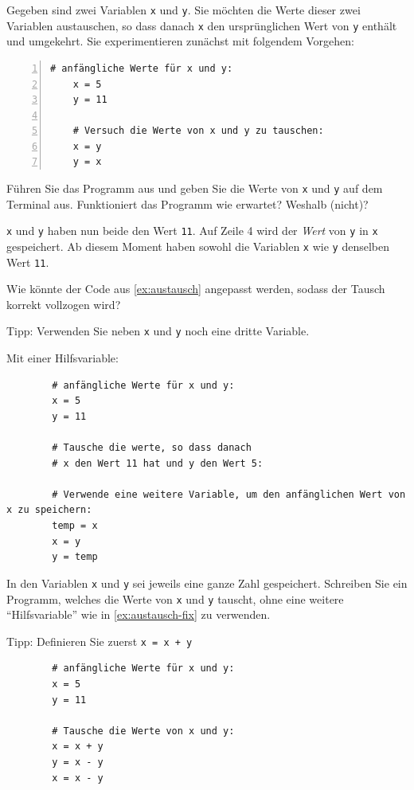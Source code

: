 \begin{myexercise}\label{ex:austausch}
	Gegeben sind zwei Variablen \lstinline|x| und \lstinline|y|. Sie möchten die Werte dieser zwei Variablen austauschen, so dass danach \lstinline|x| den ursprünglichen Wert von \lstinline|y| enthält und umgekehrt. Sie experimentieren zunächst mit folgendem Vorgehen:
	\begin{lstlisting}[numbers=left]
	# anfängliche Werte für x und y:
	x = 5 
	y = 11

	# Versuch die Werte von x und y zu tauschen:
	x = y
	y = x
\end{lstlisting}
	Führen Sie das Programm aus und geben Sie die Werte von \lstinline|x| und \lstinline|y| auf dem Terminal aus. Funktioniert das Programm wie erwartet? Weshalb (nicht)?
	\begin{myanswer}
		\lstinline|x| und \lstinline|y| haben nun beide den Wert \lstinline|11|. Auf Zeile 4 wird der \emph{Wert} von \lstinline|y| in \lstinline|x| gespeichert. Ab diesem Moment haben sowohl die Variablen \lstinline|x| wie \lstinline|y| denselben Wert \lstinline|11|.
	\end{myanswer}
\end{myexercise}

\begin{myexercise}\label{ex:austausch-fix}
	Wie könnte der Code aus \cref{ex:austausch} angepasst werden, sodass der Tausch korrekt vollzogen wird?

	Tipp: Verwenden Sie neben \lstinline|x| und \lstinline|y| noch eine dritte Variable.
	\begin{myanswer}
		Mit einer Hilfsvariable:
		\begin{lstlisting}
		# anfängliche Werte für x und y:
		x = 5 
		y = 11

		# Tausche die werte, so dass danach
		# x den Wert 11 hat und y den Wert 5:

		# Verwende eine weitere Variable, um den anfänglichen Wert von x zu speichern:
		temp = x 
		x = y
		y = temp
	\end{lstlisting}
	\end{myanswer}
\end{myexercise}

\begin{mychallenge}\label{mychallenge:tausch_mit_2_variablen}
	In den Variablen \lstinline|x| und \lstinline|y| sei jeweils eine ganze Zahl gespeichert. Schreiben Sie ein Programm, welches die Werte von \lstinline|x| und \lstinline|y| tauscht, ohne eine weitere \enquote{Hilfsvariable} wie in \cref{ex:austausch-fix} zu verwenden.

	Tipp: Definieren Sie zuerst \lstinline|x = x + y|
	\begin{myanswer}
		\begin{lstlisting}
		# anfängliche Werte für x und y:
		x = 5
		y = 11
		
		# Tausche die Werte von x und y:
		x = x + y
		y = x - y
		x = x - y
	\end{lstlisting}
	\end{myanswer}
\end{mychallenge}

